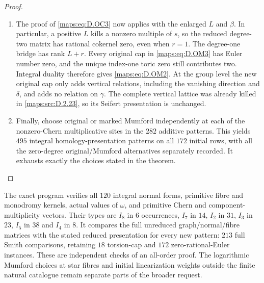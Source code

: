 \begin{proof}
\begin{enumerate}[label=\arabic*.,leftmargin=*]
\item The proof of \eqref{maps:eq:D.OC3} now applies with the enlarged $L$
and $\beta$. In particular, a positive $L$ kills a
nonzero multiple of $s$, so the reduced degree-two
matrix has rational cokernel zero, even when $r=1$.
The degree-one bridge has rank $L+r$. Every original
cap in \eqref{maps:eq:D.OM3} has Euler number zero, and the unique
index-one toric zero still contributes two. Integral
duality therefore gives \eqref{maps:eq:D.OM2}.
At the group level the new original cap only adds
vertical relations, including the vanishing direction
and $\delta$, and adds no relation on $\gamma$.
The complete vertical lattice was already killed in
\ref{maps:src:D.2.23}, so its Seifert presentation is unchanged.

\item Finally, choose original or marked Mumford independently
at each of the nonzero-Chern multiplicative sites in
the $282$ additive patterns. This yields $495$ integral homology-presentation patterns
on all $172$ initial rows, with all the zero-degree
original/Mumford alternatives separately recorded. It
exhausts exactly the choices stated in the theorem.
\end{enumerate}
\end{proof}

The exact program 
verifies all $120$ integral normal forms, primitive fibre
and monodromy kernels, actual values of $\omega$, and
primitive Chern and component-multiplicity vectors.
Their types are $I_8$ in $6$ occurrences, $I_7$ in $14$,
$I_2$ in $31$, $I_3$ in $23$, $I_5$ in $38$ and $I_4$
in $8$. It compares the full unreduced graph/normal/fibre
matrices with the stated reduced presentation for every
new pattern: $213$ full Smith comparisons, retaining
$18$ torsion-cap and $172$ zero-rational-Euler instances.
These are independent checks of an all-order proof.
The logarithmic Mumford choices at star fibres and
initial linearization weights outside the finite natural
catalogue remain separate parts of the broader request.


